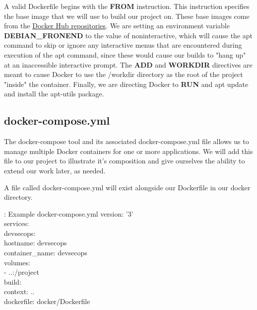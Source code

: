 \justify
A valid Dockerfile begins with the \textbf{FROM} instruction. This
instruction specifies the base image that we will use to build our
project on. These base images come from the
\href{https://docs.docker.com/docker-hub/repos/}{Docker Hub
  repositories}. We are setting an environment variable
\textbf{DEBIAN\_FRONEND} to the value of noninteractive, which will
cause the apt command to skip or ignore any interactive menus that are
encountered during execution of the apt command, since these would cause
our builds to "hang up" at an inaccessible interactive prompt. The
\textbf{ADD} and \textbf{WORKDIR} directives are meant to cause Docker
to use the /workdir directory as the root of the project "inside" the
container. Finally, we are directing Docker to \textbf{RUN} and apt
update and install the apt-utils package.

\subsection{docker-compose.yml}
\justify
The docker-compose tool and its associated docker-compose.yml file
allows us to manage multiple Docker containers for one or more
applications. We will add this file to our project to illustrate it's
composition and give ourselves the ability to extend our work later, as
needed.

\justify
A file called docker-compose.yml will exist alongside our Dockerfile in our docker directory.

\begin{mybox}{\thetcbcounter: Example docker-compose.yml}
  version: '3'\\
  services:\\
  \hspace*{7mm}devsecops:\\
  \hspace*{15mm}hostname: devsecops\\
  \hspace*{15mm}container\_name: devsecops\\
  \hspace*{7mm}volumes:\\
  \hspace*{15mm}- ..:/project\\
  \hspace*{7mm}build:\\
  \hspace*{15mm}context: ..\\
  \hspace*{15mm}dockerfile: docker/Dockerfile
\end{mybox}

